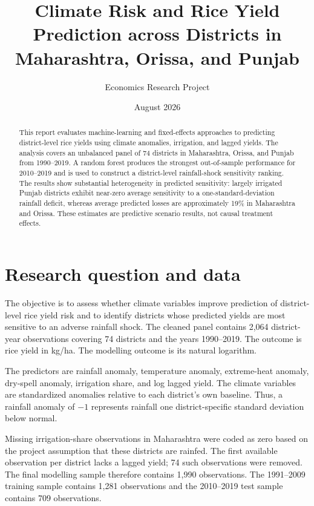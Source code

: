 \documentclass[11pt]{article}
\title{Climate Risk and Rice Yield Prediction across Districts in Maharashtra, Orissa, and Punjab}
\author{Economics Research Project}
\date{August 2026}
\begin{document}
\maketitle

\begin{abstract}
This report evaluates machine-learning and fixed-effects approaches to predicting district-level rice yields using climate anomalies, irrigation, and lagged yields. The analysis covers an unbalanced panel of 74 districts in Maharashtra, Orissa, and Punjab from 1990--2019. A random forest produces the strongest out-of-sample performance for 2010--2019 and is used to construct a district-level rainfall-shock sensitivity ranking. The results show substantial heterogeneity in predicted sensitivity: largely irrigated Punjab districts exhibit near-zero average sensitivity to a one-standard-deviation rainfall deficit, whereas average predicted losses are approximately 19\% in Maharashtra and Orissa. These estimates are predictive scenario results, not causal treatment effects.
\end{abstract}

\section{Research question and data}

The objective is to assess whether climate variables improve prediction of district-level rice yield risk and to identify districts whose predicted yields are most sensitive to an adverse rainfall shock. The cleaned panel contains 2,064 district-year observations covering 74 districts and the years 1990--2019. The outcome is rice yield in kg/ha. The modelling outcome is its natural logarithm.

The predictors are rainfall anomaly, temperature anomaly, extreme-heat anomaly, dry-spell anomaly, irrigation share, and log lagged yield. The climate variables are standardized anomalies relative to each district's own baseline. Thus, a rainfall anomaly of $-1$ represents rainfall one district-specific standard deviation below normal.

Missing irrigation-share observations in Maharashtra were coded as zero based on the project assumption that these districts are rainfed. The first available observation per district lacks a lagged yield; 74 such observations were removed. The final modelling sample therefore contains 1,990 observations. The 1991--2009 training sample contains 1,281 observations and the 2010--2019 test sample contains 709 observations.
\end{document}
